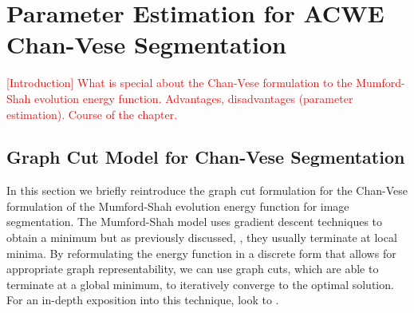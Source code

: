 
\chapter{Parameter Estimation for ACWE Chan-Vese Segmentation} %

\label{chap:Chapter6} %

\textcolor{red}{[Introduction] What is special about the Chan-Vese formulation to the Mumford-Shah evolution energy function. Advantages, disadvantages (parameter estimation). Course of the chapter.}


\section{Graph Cut Model for Chan-Vese Segmentation}
\label{sec:chanveseGC}

In this section we briefly reintroduce the graph cut formulation for the Chan-Vese formulation of the Mumford-Shah evolution energy function for image segmentation. The Mumford-Shah model uses gradient descent techniques to obtain a minimum but as previously discussed, , they usually terminate at local minima. By reformulating the energy function in a discrete form that allows for appropriate graph representability, we can use graph cuts, which are able to terminate at a global minimum, to iteratively converge to the optimal solution. For an in-depth exposition into this technique, look to \citep{Mumford1989,Chan2001,ElZehiry2007}.

